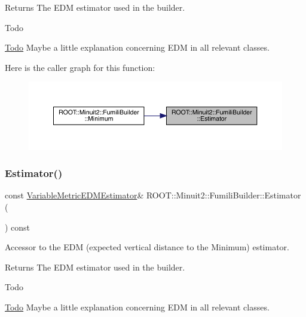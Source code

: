 \begin{DoxyReturn}{Returns}
The E\+DM estimator used in the builder.
\end{DoxyReturn}
\begin{DoxyRefDesc}{Todo}
\item[\mbox{\hyperlink{todo__todo000005}{Todo}}]Maybe a little explanation concerning E\+DM in all relevant classes.\end{DoxyRefDesc}
Here is the caller graph for this function\+:
\nopagebreak
\begin{figure}[H]
\begin{center}
\leavevmode
\includegraphics[width=350pt]{dc/dcb/classROOT_1_1Minuit2_1_1FumiliBuilder_a1e7bd763cd6677dd08d528079143d7b2_icgraph}
\end{center}
\end{figure}
\mbox{\label{classROOT_1_1Minuit2_1_1FumiliBuilder_a1e7bd763cd6677dd08d528079143d7b2}} 
\subsubsection{\texorpdfstring{Estimator()}{Estimator()}\hspace{0.1cm}{\footnotesize\ttfamily [2/3]}}
{\footnotesize\ttfamily const \mbox{\hyperlink{classROOT_1_1Minuit2_1_1VariableMetricEDMEstimator}{Variable\+Metric\+E\+D\+M\+Estimator}}\& R\+O\+O\+T\+::\+Minuit2\+::\+Fumili\+Builder\+::\+Estimator (\begin{DoxyParamCaption}{ }\end{DoxyParamCaption}) const\hspace{0.3cm}{\ttfamily [inline]}}

Accessor to the E\+DM (expected vertical distance to the Minimum) estimator.

\begin{DoxyReturn}{Returns}
The E\+DM estimator used in the builder.
\end{DoxyReturn}
\begin{DoxyRefDesc}{Todo}
\item[\mbox{\hyperlink{todo__todo000029}{Todo}}]Maybe a little explanation concerning E\+DM in all relevant classes.\end{DoxyRefDesc}
\mbox{\label{classROOT_1_1Minuit2_1_1FumiliBuilder_a1e7bd763cd6677dd08d528079143d7b2}} 
